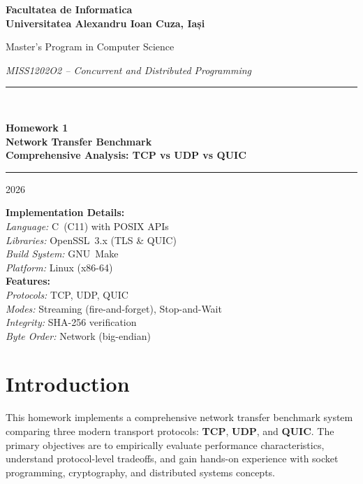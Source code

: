 \documentclass[12pt,a4paper]{article}
\begin{document}
\begin{titlepage}
  \centering
  \vspace*{1.5cm}
  {\LARGE\bfseries Facultatea de Informatica\\[0.4em]
   Universitatea Alexandru Ioan Cuza, Iași\par}
  \vspace{0.5cm}
  {\large Master's Program in Computer Science\par}
  \vspace{1.5cm}
  {\large\itshape MISS1202O2 – Concurrent and Distributed Programming\par}
  \vspace{2.5cm}
  \rule{\linewidth}{2pt}\\[0.8em]
  {\Huge\bfseries Homework 1\\[0.4em]
   Network Transfer Benchmark\\[0.3em]
   {\large Comprehensive Analysis: TCP vs UDP vs QUIC}\par}
  \rule{\linewidth}{2pt}
  \vspace{3cm}
  {\large 2026\par}
  \vfill
  {\normalsize
   \textbf{Implementation Details:}\\[0.3em]
   \textit{Language:} C~(C11) with POSIX APIs\\
   \textit{Libraries:} OpenSSL~3.x (TLS \& QUIC)\\
   \textit{Build System:} GNU~Make\\[0.5em]
   \textit{Platform:} Linux (x86-64)\\[0.3em]
   \textbf{Features:}\\
   \textit{Protocols:} TCP, UDP, QUIC\\
   \textit{Modes:} Streaming (fire-and-forget), Stop-and-Wait\\
   \textit{Integrity:} SHA-256 verification\\
   \textit{Byte Order:} Network (big-endian)}
\end{titlepage}

\tableofcontents
\newpage

\section{Introduction}
\label{sec:intro}

This homework implements a comprehensive network transfer benchmark system comparing three modern transport protocols: \textbf{TCP}, \textbf{UDP}, and \textbf{QUIC}. The primary objectives are to empirically evaluate performance characteristics, understand protocol-level tradeoffs, and gain hands-on experience with socket programming, cryptography, and distributed systems concepts.
\end{document}
